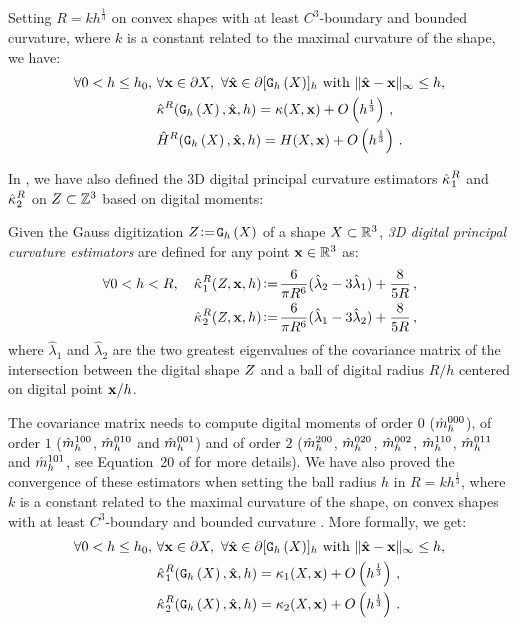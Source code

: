 \documentclass{llncs}
\begin{document}
%
Setting $R = kh^\frac{1}{3}$ on convex shapes
with at least $C^3$-boundary and bounded curvature, where $k$ is a constant
related to the maximal curvature of the shape, we have:
%
\begin{align}
\forall 0 < h \le h_0,\,\, &\forall \vx \in \Bd{\Shape},\,\,
\forall \vxH \in \Bd{\Body{\DSh}{h}} \text{~with~} \| \vxH -\vx\|_\infty \le h, \nonumber \\
&\CurvH{R}(\DSh, \vxH, h) = \Curv(\Shape, \vx) + O\left(h^{\frac{1}{3}}\right)\,,\\
&\MeanCurvH{R}(\DSh, \vxH, h) = \MeanCurv(\Shape, \vx) + O\left(h^{\frac{1}{3}}\right)\,.
\end{align}

In \cite{CVIU2014}, we have also defined the 3D digital principal curvature
estimators $\PrincCurvH{1}{R}$ and $\PrincCurvH{2}{R}$ on $Z\subset\Z^3$ based
on digital moments:
%
\begin{Definition}
  Given the Gauss digitization $Z \EqDef \DSh$ of a shape $\Shape \subset \R^3$,
  {\em 3D digital principal curvature estimators} are defined for any point $\vx
  \in \R^3$ as:
  \begin{align}
    \forall 0 < h < R,\quad
    \PrincCurvH{1}{R}(Z,\vx,h) &\EqDef \frac{6}{\pi {R}^6}(\hat{\lambda}_2 - 3\hat{\lambda}_1) + \frac{8}{5 R} \,,\label{eq:dig-curvature-estimator-k1}\\
    \PrincCurvH{2}{R}(Z,\vx,h) &\EqDef \frac{6}{\pi {R}^6}(\hat{\lambda}_1 - 3\hat{\lambda}_2) + \frac{8}{5 R} \,,
    \label{eq:dig-curvature-estimator-k2}
  \end{align}
  where $\hat{\lambda}_1$ and $\hat{\lambda}_2$ are the two greatest eigenvalues
  of the covariance matrix of the intersection between the digital shape
  $\DigShape$ and a ball of digital radius $R/h$ centered on digital point
  $\vx/h$.
\end{Definition}
%
The covariance matrix needs to compute digital moments of order $0$
($\DMom{000}{h}$), of order $1$ ($\DMom{100}{h}$, $\DMom{010}{h}$ and
$\DMom{001}{h}$) and of order $2$ ($\DMom{200}{h}$, $\DMom{020}{h}$,
$\DMom{002}{h}$, $\DMom{110}{h}$, $\DMom{011}{h}$ and $\DMom{101}{h}$, see
Equation~20 of \cite{CVIU2014} for more details). We have also proved the
convergence of these estimators when setting the ball radius $h$ in $R =
kh^\frac{1}{3}$, where $k$ is a constant related to the maximal curvature of the
shape, on convex shapes with at least $C^3$-boundary and bounded curvature
\cite{CVIU2014}. More formally, we get:
%
\begin{align}
  \forall 0 < h \le h_0,\,\, &\forall \vx \in \Bd{\Shape},\,\,
  \forall \vxH \in \Bd{\Body{\DSh}{h}} \text{~with~} \| \vxH -\vx\|_\infty \le h, \nonumber \\
  &\PrincCurvH{1}{R}(\DigF{\Shape}{h},\vxH, h) = \PrincCurv{1}(\Shape,\vx) + O\left(h^{\frac{1}{3}}\right) \,,\\
  &\PrincCurvH{2}{R}(\DigF{\Shape}{h},\vxH, h) = \PrincCurv{2}(\Shape,\vx) + O\left(h^{\frac{1}{3}}\right) \,.
\end{align}
\end{document}
